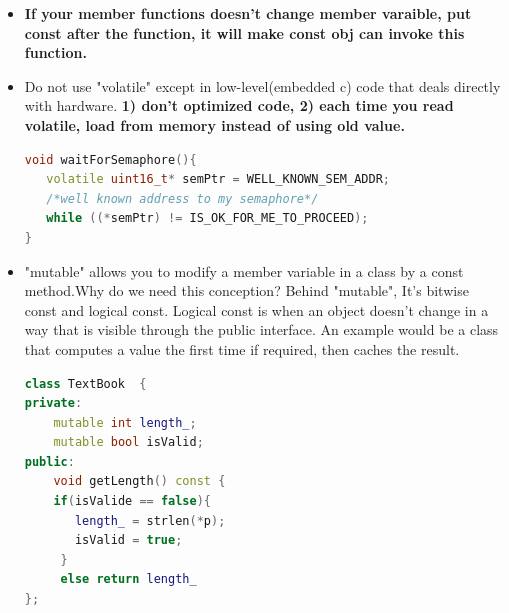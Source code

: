 \documentclass[a4paper,12pt,twoside]{book}
\newcommand{\Hilight}[1]{\makebox[0pt][l]{\color{yellow}\rule[-3pt]{#1em}{11pt}}}
\begin{document}
\begin{itemize}
\begin{enumerate}
\item The most common use of \texttt{const} overloading is with the subscript operator. You should generally try to use one of the standard container templates, such as std::vector, but if you need to create your own class that has a subscript operator, here's the rule of thumb:\textbf{ subscript operators often come in pairs.}
\begin{lstlisting}[frame=single, language=c++, mathescape=true]
class Fred { /*...*/ };
class MyFredList {
public:
  $\Hilight{7}$const Fred& operator[] (unsigned index) const;
  // Subscript operators often come in pairs

  Fred&  operator[] (unsigned index);
  // Subscript operators often come in pairs
};
\end{lstlisting}


\end{enumerate}

\item \textbf{If your member functions doesn't change member varaible, put const after the function, it will make const obj can invoke this function.}

\item Do not use "volatile" except in low-level(embedded c) code that deals directly with hardware. \textbf{1) don't optimized code, 2) each time you read volatile, load from memory instead of using old value.}
\begin{lstlisting}[frame=single, language=c++]
void waitForSemaphore(){
   volatile uint16_t* semPtr = WELL_KNOWN_SEM_ADDR;
   /*well known address to my semaphore*/
   while ((*semPtr) != IS_OK_FOR_ME_TO_PROCEED);
}
\end{lstlisting}

\item "mutable" allows you to modify a member variable in a class by a const method.Why do we need this conception? Behind "mutable", It's bitwise const and logical const. Logical const is when an object doesn't change in a way that is visible through the public interface. An example would be a class that computes a value the first time if required, then caches the result.
\begin{lstlisting}[frame=single, language=c++]
class TextBook  {
private:
    mutable int length_;
    mutable bool isValid;
public:
    void getLength() const {
    if(isValide == false){
       length_ = strlen(*p);
       isValid = true; 
     }
     else return length_
};
\end{lstlisting}



\end{itemize}
\end{document}

